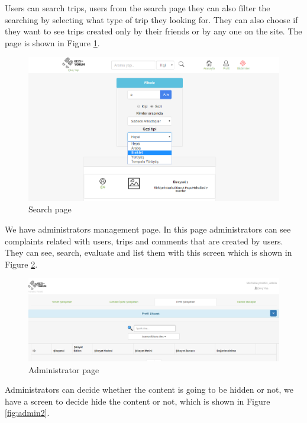 Users can search trips, users from the search page they can also filter the searching by selecting what type of trip they looking for. They can also choose if they want to see trips   created only by their friends or by any one on the site. The page is shown in Figure   \ref{fig:searchPageWeb}.

\begin{figure}[!htbp]
\centering
\includegraphics[scale= 0.4]{projectChapters/images/searchPageWeb.png}
\caption{Search page}
\label{fig:searchPageWeb}
\end{figure}

\newpage

We have administrators management page. In this page administrators can see complaints related with users, trips and comments that are created by users. They can see, search, evaluate and list them with this screen which is shown in Figure \ref{fig:admin1}.
\begin{figure}[!htbp]
\centering
\includegraphics[width=\textwidth]{projectChapters/images/admin1.png}
\caption{Administrator page}
\label{fig:admin1}
\end{figure}

Administrators can decide whether the content is going to be hidden or not, we have a screen to decide hide the content or not, which is shown in Figure  \ref{fig:admin2}.

